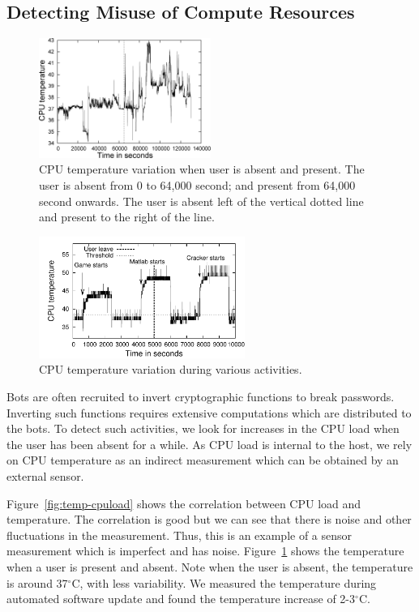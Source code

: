 \subsection{Detecting Misuse of Compute Resources} \label{sec:sensor-passwordcrack}

\begin{figure}[tb]
\centering
\includegraphics[width=0.5\textwidth]{sensor/normal-cat.png}
\caption{CPU temperature variation when user is absent and present. 
The user is absent from 0 to 64,000 second;
and present from 64,000 second onwards. The user is absent left of
the vertical dotted line and present to the right of the line.
} 
\label{fig:temp-norm}
\end{figure}


\begin{figure}[tb]
\centering
\includegraphics[width=0.6\textwidth]{sensor/temp-activities.pdf}
\caption{CPU temperature variation during various activities.}
\label{fig:temp-activities}
\end{figure}

Bots are often recruited to invert cryptographic functions to break
passwords. Inverting such functions requires extensive computations
which are distributed to the bots. To detect such activities, we
look for increases in the CPU load when the user has been absent for a
while. As CPU load is internal to the host,
we rely on CPU temperature as an indirect measurement which can
be obtained by an external sensor.

Figure~\ref{fig:temp-cpuload} shows the correlation between CPU load
and temperature.
The correlation is good but we can see that there is
noise and other fluctuations in the measurement.
Thus, this is an example of a sensor measurement which is imperfect and
has noise.
Figure~\ref{fig:temp-norm} shows the temperature when a user
is present and absent. Note when the user is absent, the temperature
is around 37$^\circ$C, with less variability.  We measured the
temperature during automated software update and found the
temperature increase of 2-3$^\circ$C.

